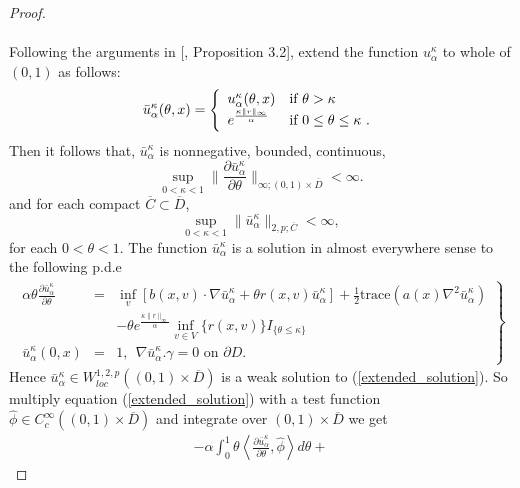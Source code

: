 \documentclass[11pt]{amsart}
\numberwithin{equation}{section}
\begin{document}
\begin{proof}
\paragraph{} Following the arguments in [\cite{menaldi_robin}, Proposition 3.2], extend the function $u^{\kappa}_{\alpha}$ 
to whole of $(0,1)$ as follows:
\begin{equation*}
\bar u^{\kappa}_{\alpha}(\theta,x)=\left\{ \begin{array}{ll}
u^{\kappa}_{\alpha}(\theta,x) & \mbox{if $\theta > \kappa$ } \\  
  \displaystyle{ e^{\frac{\kappa \|r\|_{\infty}}{\alpha} } } & \mbox{if $ 0\leq \theta \leq \kappa$ }.
\end{array}\right.
\end{equation*}
Then it follows that, $\bar u^{\kappa}_{\alpha}$ is nonnegative, bounded, continuous,
$$
\sup_{0<\kappa<1} \Big\| \frac{\partial \bar u^{\kappa}_{\alpha}}{\partial \theta}  
\Big\|_{\infty ; (0,1)\times  \overline{D}} < \infty.
$$
and for each compact $\overline{C} \subset \overline{D}$, 
$$
\sup_{0<\kappa<1} \| \bar u^{\kappa}_{\alpha} \|_{2,p ; \overline{C}} < \infty,
$$
 for each $0< \theta < 1$.
The function $\bar u^{\kappa}_{\alpha}$ is a solution in almost everywhere sense to the following p.d.e
\begin{eqnarray}\label{extended_solution}
\left.
\begin{array}{rcl}
\displaystyle{
 \alpha\theta\frac{\partial \bar u^{\kappa}_{\alpha}}{\partial \theta} } &=& \displaystyle{ \inf_{v} \left[ b(x,v)\cdot 
\nabla \bar u^{\kappa}_{\alpha} + \theta r(x,v)\bar u^{\kappa}_{\alpha}\right] +\frac{1}{2}\mbox{trace}
(a(x)\nabla^2 \bar u^{\kappa}_{\alpha}) } \\
&&- \displaystyle{ \theta e^{\frac{\kappa \|r\|_{\infty}}{\alpha}}\inf_{v\in V} \{ r(x,v) \} I_{\{\theta\leq \kappa\}} }\\
\displaystyle{ \bar u^{\kappa}_{\alpha}(0,x) } &=& \displaystyle{ 1 , \ 
\ \nabla \bar u^{\kappa}_{\alpha}.\gamma=0 \mbox{ on } \partial  D. }
\end{array}
\right\}
\end{eqnarray}
Hence $\bar u^{\kappa}_{\alpha} \in W^{1,2,p}_{loc}((0,1)\times \overline{D}  ) $  is a weak solution to 
(\ref{extended_solution}).
So multiply equation (\ref{extended_solution}) with a test function $\hat \phi \in 
C^{\infty}_c((0,1)\times \overline{D})$ 
and integrate over $(0,1)\times \overline{D}$ we get
\begin{eqnarray}\label{test}
-\alpha \int_0^1 \theta \left\langle \frac{ \partial \bar u^{\kappa}_{\alpha} }{\partial \theta}, \hat \phi\right\rangle d\theta  +

\end{eqnarray}
\end{proof}
\end{document}
